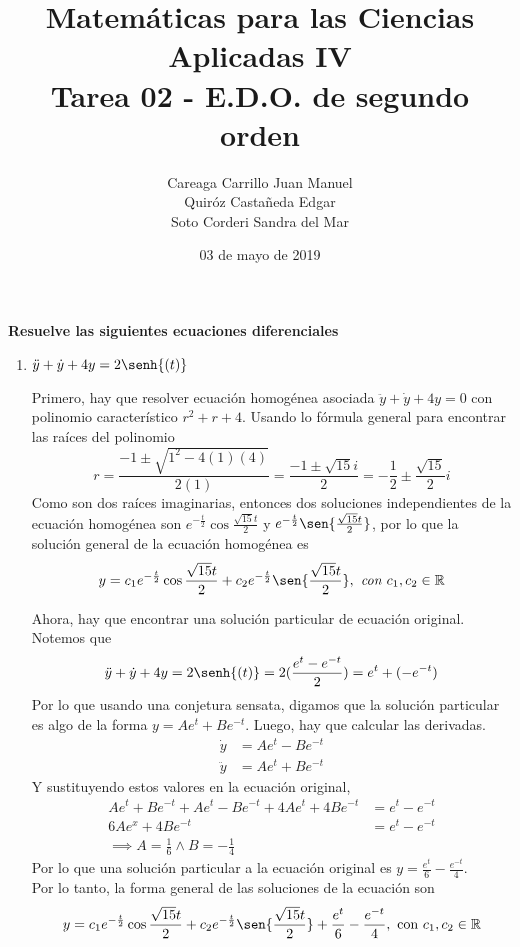 \documentclass{article}
\title{
    Matemáticas para las Ciencias Aplicadas IV\\
    Tarea 02 - E.D.O. de segundo orden
}
\author{
    Careaga Carrillo Juan Manuel \\
    Quiróz Castañeda Edgar \\
    Soto Corderi Sandra del Mar
}
\date{
    03 de mayo de 2019
}
\begin{document}
    \maketitle
    {\bf Resuelve las siguientes ecuaciones diferenciales}
    \begin{enumerate}
        \item {
            $\ddot y+\dot y+4y=2\senh{(t)}$\\
            \color{azul}
            
            Primero, hay que resolver ecuación homogénea asociada
            $\ddot y+\dot y+4y=0$ con polinomio característico
            $r^2+r+4$.
            Usando lo fórmula general para encontrar las raíces del polinomio
            \[
            r = \frac{-1\pm\sqrt{1^2-4(1)(4)}}{2(1)} =
            \frac{-1\pm\sqrt{15}i}{2} =
            -\frac{1}{2}\pm\frac{\sqrt{15}}{2}i
            \]
            Como son dos raíces imaginarias, entonces dos soluciones
            independientes de la ecuación
            homogénea son $e^{-\frac{t}{2}}\cos{\frac{\sqrt{15}t}{2}}$ 
            y $e^{-\frac{t}{2}}\sen{\frac{\sqrt{15}t}{2}}$, por lo que 
            la solución general de la ecuación homogénea es
            \[y = c_1e^{-\frac{t}{2}}\cos{\frac{\sqrt{15}t}{2}} + 
            c_2e^{-\frac{t}{2}}\sen{\frac{\sqrt{15}t}{2}}, \textit{ con } c_1, c_2 \in \mathbb{R}\]
            
            Ahora, hay que encontrar una solución particular de ecuación
            original. Notemos que
            \[
            \ddot y+\dot y+4y=2\senh{(t)} = 
            2(\frac{e^t-e^{-t}}{2}) = 
            e^t+ (-e^{-t})
            \]
            Por lo que usando una conjetura sensata, digamos que la
            solución particular es algo de la forma $y=Ae^t+Be^{-t}$.
            Luego, hay que calcular las derivadas.
            \begin{align*}
                \dot y &= Ae^t-Be^{-t} \\
                \ddot y &= Ae^t+Be^{-t}
            \end{align*}
            Y sustituyendo estos valores en la ecuación original, 
            \begin{align*}
                 Ae^t+Be^{-t} + Ae^t-Be^{-t} + 4Ae^t+4Be^{-t} &= 
                 e^t-e^{-t}\\
                 6Ae^x+4Be^{-t} &=e^t-e^{-t} \\
                 \implies A = \frac{1}{6} \land B = -\frac{1}{4}
            \end{align*}
            Por lo que una solución particular a la ecuación original
            es $y = \frac{e^t}{6}-\frac{e^{-t}}{4}$. \\
            Por lo tanto, la forma general de las soluciones de la 
            ecuación son 
            \[y = c_1e^{-\frac{t}{2}}\cos{\frac{\sqrt{15}t}{2}} + 
            c_2e^{-\frac{t}{2}}\sen{\frac{\sqrt{15}t}{2}} +
            \frac{e^t}{6}-\frac{e^{-t}}{4}, \text{ con } 
            c_1, c_2 \in \mathbb{R}\]\\[.03cm]
            
}
\end{enumerate}
\end{document}
